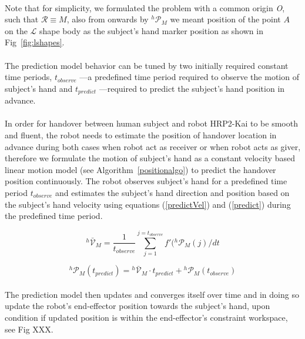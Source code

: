 \paragraph*{}
Note that for simplicity, we formulated the problem with a common origin {\it O}, such that $\mathcal R \equiv M$, also from onwards by ${}^{h}\mathcal{P}_M$ we meant position of the point $A$ on the $\mathcal{L}$ shape body as the subject's hand marker position as shown in Fig~\ref{fig:lshapes}.


\paragraph*{}
The prediction model behavior can be tuned by two initially required constant time periods, $t_{observe}$ ---a predefined time period required to observe the motion of subject's hand and $t_{predict}$ ---required to predict the subject's hand position in advance.

\paragraph*{}
In order for handover between human subject and robot HRP2-Kai to be smooth and fluent, the robot needs to estimate the position of handover location in advance during both cases when robot act as receiver or when robot acts as giver, therefore we formulate the motion of subject's hand as a constant velocity based linear motion model (see Algorithm~\ref{positionalgo}) to predict the handover position continuously. The robot observes subject's hand for a predefined time period $t_{observe}$ and estimates the subject's hand direction and position based on the subject's hand velocity using equations (\ref{predictVel}) and (\ref{predict}) during the predefined time period. 

\begin{equation} \label{predictVel}
{}^{h}\mathcal{\bar{V}}_{M} = \frac{1}{t_{observe}}{\sum_{j=1}^{j=t_{observe}} f'({}^{h}\mathcal{P}_{M}(j)/dt }
\end{equation}


\begin{equation} \label{predict}
{}^{h}\mathcal{P}_M(t_{predict}) = {}^{h}\mathcal{\bar{V}}_{M} \cdot t_{predict}  + {}^{h}\mathcal{P}_{M}(t_{observe})
\end{equation}

\paragraph*{}
The prediction model then updates and converges itself over time and in doing so update the robot's end-effector position towards the subject's hand, upon condition if updated position is within the end-effector's constraint workspace, see Fig XXX.

